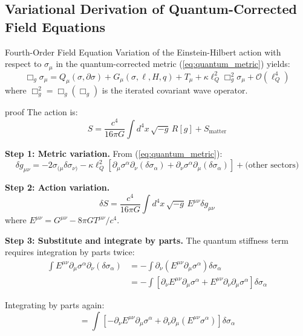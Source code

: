 \documentclass[11pt,a4paper]{article}
\theoremstyle{definition}
\theoremstyle{remark}
\begin{document}
	\subsection{Variational Derivation of Quantum-Corrected Field Equations}
	
	Fourth-Order Field Equation
		Variation of the Einstein-Hilbert action with respect to $\sigma_\mu$ in the quantum-corrected metric (\ref{eq:quantum_metric}) yields:
		\begin{equation}\label{eq:fourth_order}
			\boxed{\Box_g\sigma_\mu = Q_\mu(\sigma,\partial\sigma) + G_\mu(\sigma,\ell,H,q) + T_\mu + \kappa\ell_Q^2\Box_g^2\sigma_\mu + \mathcal{O}(\ell_Q^4)}
		\end{equation}
		where $\Box_g^2 = \Box_g(\Box_g)$ is the iterated covariant wave operator.
	
	proof
		The action is:
		\begin{equation}
			S = \frac{c^4}{16\pi G}\int d^4x\,\sqrt{-g}\,R[g] + S_{\text{matter}}
		\end{equation}
		
		\textbf{Step 1: Metric variation.}
		From (\ref{eq:quantum_metric}):
		\begin{equation}
			\delta g_{\mu\nu} = -2\sigma_{(\mu}\delta\sigma_{\nu)} - \kappa\ell_Q^2[\partial_\mu\sigma^\alpha\partial_\nu(\delta\sigma_\alpha) + \partial_\nu\sigma^\alpha\partial_\mu(\delta\sigma_\alpha)] + \text{(other sectors)}
		\end{equation}
		
		\textbf{Step 2: Action variation.}
		\begin{equation}
			\delta S = \frac{c^4}{16\pi G}\int d^4x\,\sqrt{-g}\,E^{\mu\nu}\delta g_{\mu\nu}
		\end{equation}
		where $E^{\mu\nu} = G^{\mu\nu} - 8\pi GT^{\mu\nu}/c^4$.
		
		\textbf{Step 3: Substitute and integrate by parts.}
		The quantum stiffness term requires integration by parts twice:
		\begin{align}
			\int E^{\mu\nu}\partial_\mu\sigma^\alpha\partial_\nu(\delta\sigma_\alpha) &= -\int\partial_\nu(E^{\mu\nu}\partial_\mu\sigma^\alpha)\delta\sigma_\alpha\\
			&= -\int[\partial_\nu E^{\mu\nu}\partial_\mu\sigma^\alpha + E^{\mu\nu}\partial_\nu\partial_\mu\sigma^\alpha]\delta\sigma_\alpha
		\end{align}
		
		Integrating by parts again:
		\begin{equation}
			= \int[-\partial_\nu E^{\mu\nu}\partial_\mu\sigma^\alpha + \partial_\nu\partial_\mu(E^{\mu\nu}\sigma^\alpha)]\delta\sigma_\alpha
		\end{equation}
		
\end{document}
